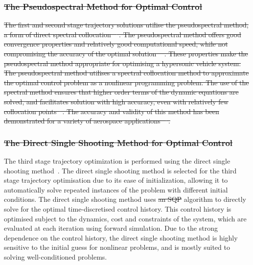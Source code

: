 \documentclass[journal]{new-aiaa}
\providecommand{\DIFadd}[1]{{\protect\color{blue}\uwave{#1}}} %
\providecommand{\DIFdel}[1]{{\protect\color{red}\sout{#1}}}                      %
\providecommand{\DIFaddbegin}{} %
\providecommand{\DIFaddend}{} %
\providecommand{\DIFdelbegin}{} %
\providecommand{\DIFdelend}{} %
\newcommand{\DIFscaledelfig}{0.5}
\newlength{\DIFdelgraphicswidth} %
\newlength{\DIFdelgraphicsheight} %
\newcommand{\DIFaddincludegraphics}[2][]{{\color{blue}\fbox{\DIFOincludegraphics[#1]{#2}}}} %
\newcommand{\DIFdelincludegraphics}[2][]{%
\sbox{\DIFdelgraphicsbox}{\DIFOincludegraphics[#1]{#2}}%
\settoboxwidth{\DIFdelgraphicswidth}{\DIFdelgraphicsbox} %
\settoboxtotalheight{\DIFdelgraphicsheight}{\DIFdelgraphicsbox} %
\scalebox{\DIFscaledelfig}{%
\parbox[b]{\DIFdelgraphicswidth}{\usebox{\DIFdelgraphicsbox}\\[-\baselineskip] \rule{\DIFdelgraphicswidth}{0em}}\llap{\resizebox{\DIFdelgraphicswidth}{\DIFdelgraphicsheight}{%
\setlength{\unitlength}{\DIFdelgraphicswidth}%
\begin{picture}(1,1)%
\thicklines\linethickness{2pt} %
{\color[rgb]{1,0,0}\put(0,0){\framebox(1,1){}}}%
{\color[rgb]{1,0,0}\put(0,0){\line( 1,1){1}}}%
{\color[rgb]{1,0,0}\put(0,1){\line(1,-1){1}}}%
\end{picture}%
}\hspace*{3pt}}} %
} %
\DeclareRobustCommand{\DIFaddbegin}{\DIFOaddbegin \let\includegraphics\DIFaddincludegraphics} %
\DeclareRobustCommand{\DIFaddend}{\DIFOaddend \let\includegraphics\DIFOincludegraphics} %
\DeclareRobustCommand{\DIFdelbegin}{\DIFOdelbegin \let\includegraphics\DIFdelincludegraphics} %
\DeclareRobustCommand{\DIFdelend}{\DIFOaddend \let\includegraphics\DIFOincludegraphics} %
\begin{document}
\DIFdelbegin \subsubsection{\DIFdel{The Pseudospectral Method for Optimal Control}}
\addtocounter{subsubsection}{-1}%
\DIFdel{The first and second stage trajectory solutions utilise the pseudospectral method, a form of direct spectral collocation \mbox{%
\cite{Fahroo2000}}%
.
The pseudospectral method offers good convergence properties and relatively good computational speed, while not compromising the accuracy of the optimal solution \mbox{%
\cite{Fasano2013}}%
. These properties make the pseudospectral method appropriate for optimising a hypersonic vehicle system. 
The pseudospectral method utilises a spectral collocation method to approximate the optimal control problem as a nonlinear programming problem. The use of the spectral method ensures that higher order terms of the dynamic equations are solved, and facilitates solution with high accuracy, even with relatively few collocation points\mbox{%
\cite{Fahroo1999}}%
. The accuracy and validity of this method has been demonstrated for a variety of aerospace applications \mbox{%
\cite{Bedrossian,Huntington2008,Josselyn2002,Yan2007}}%
. 
}%

\subsubsection{\DIFdel{The Direct Single Shooting Method for Optimal Control}}
\addtocounter{subsubsection}{-1}%

\DIFdelend The third stage trajectory optimization is performed using the direct single shooting method~\cite{Diehl2006}. The direct single shooting method is selected for the third stage trajectory optimisation due to its ease of initialization, allowing it to automatically solve repeated instances of the problem with different initial conditions. 
The direct single shooting method uses \DIFdelbegin \DIFdel{an SQP }\DIFdelend \DIFaddbegin \DIFadd{\textcolor{red}{an SQP} }\DIFaddend algorithm to directly solve for the optimal time-discretised control history\DIFaddbegin \DIFadd{\textcolor{red}{\cite{Rao2009}}}\DIFaddend .
This control history is optimised subject to the dynamics, cost and constraints of the system, which are evaluated at each iteration using forward simulation.
Due to the strong dependence on the control history, the direct single shooting method is highly sensitive to the initial guess for nonlinear problems, and is mostly suited to solving well-conditioned problems.
\end{document}
